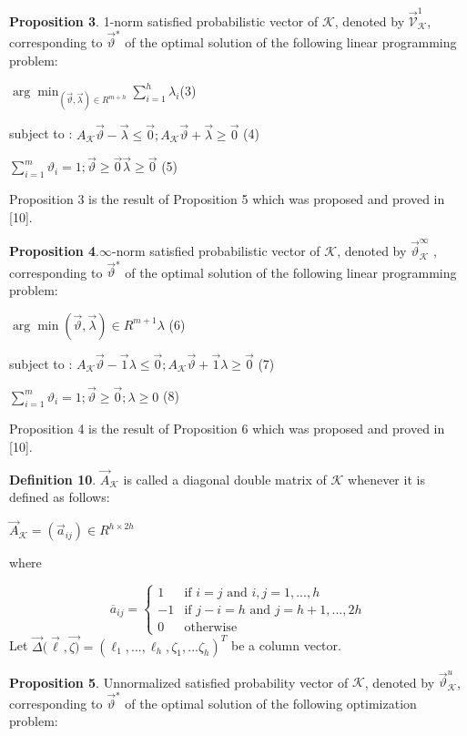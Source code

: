\documentclass[10pt,a4paper]{IOS-Book-Article}
\begin{document}
\textbf{Proposition 3}. 1-norm satisfied probabilistic vector of $\mathcal{K}$, denoted by $\vec{\mathcal{V}}^1_\mathcal{K}$, corresponding to $\vec{\vartheta}^∗$ of the optimal solution of the following linear programming problem:

$\arg \min _{(\vec{\vartheta},\vec{\lambda}) \in R^{m+h}} \sum^h_{i=1}\lambda_i$(3)

subject to : $A_\mathcal{K} \vec{\vartheta} − \vec{\lambda} \le \vec{0}; A_\mathcal{K}\vec{\vartheta} + \vec{\lambda}\geq\vec{0}$ (4)

$\sum^m_{i=1} \vartheta_i = 1; \vec{\vartheta}\geq\vec{0}  	\vec{\lambda}\geq \vec{0}$ (5)

Proposition 3 is the result of Proposition 5 which was proposed and proved in [10].

\textbf{Proposition 4}.$\infty$-norm satisfied probabilistic vector of $\mathcal{K}$, denoted by $\vec{\vartheta}^\infty_\mathcal{K}$ , corresponding to $\vec{\vartheta}^∗$ of the optimal solution of the following linear programming problem:

$\arg \min(\vec{\vartheta},\vec{\lambda}) \in R^{m+1}\lambda$ (6)

subject to : $A_\mathcal{K}\vec{\vartheta} −\vec{1}\lambda \le \vec{0}; A_\mathcal{K}\vec{\vartheta} +\vec{1}\lambda \geq \vec{0}$ (7)

$\sum^m_{i=1} \vartheta_i = 1; \vec{\vartheta}\geq\vec{0}; \lambda\geq 0$ (8)

Proposition 4 is the result of Proposition 6 which was proposed and proved in [10].

\textbf{Definition 10}. $\vec{A}_\mathcal{K}$ is called a diagonal double matrix of $\mathcal{K}$ whenever it is defined as follows: 

$\vec{A}_\mathcal{K} = (\vec{a}_{ij}) \in R^{h \times 2h}$

where

$$\overline{a}_{ij} =
\begin{cases}
 1		&\text{if $i = j$ and $i, j = 1, ... , h$}\\
 −1 	&\text{if $j − i = h$ and $j = h + 1, ... , 2h$}\\
 0 		&\text{otherwise}
\end{cases}
$$
Let $\vec{\Delta}(\vec{\ell},\vec{\zeta)} = (\ell_1, ..., \ell_h, \zeta_1, ...\zeta_h)^T$ be a column vector.

\textbf{Proposition 5}. Unnormalized satisfied probability vector of $\mathcal{K}$, denoted by $\vec{\vartheta}^u_\mathcal{K}$, corresponding to $\vec{\vartheta}^∗$ of the optimal solution of the following optimization problem:
\end{document}
